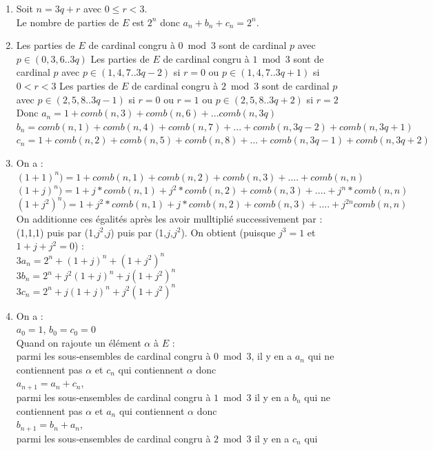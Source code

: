\documentclass[a4paper,11pt]{book}
\begin{document}
\begin{enumerate}
\item Soit $n=3q+r$ avec $0\leq r<3$.\\
Le nombre de parties de $E$ est $2^n$ donc $a_n+b_n+c_n=2^n$.
\item Les parties de $E$ de cardinal congru \`a $0\bmod 3$ sont de cardinal $p$
avec $p\in (0,3,6..3q)$
Les parties de $E$ de cardinal congru \`a $1\bmod 3$ sont de cardinal $p$
avec $p\in (1,4,7..3q-2)$ si $r=0$ ou $p\in (1,4,7..3q+1)$ si $0<r<3$
Les parties de $E$ de cardinal congru \`a $2\bmod 3$ sont de cardinal $p$
avec $p\in (2,5,8..3q-1)$ si $r=0$ ou $r=1$ ou $p\in (2,5,8..3q+2)$ si $r=2$
Donc
$a_n=1+comb(n,3)+comb(n,6)+...comb(n,3q)$
$b_n=comb(n,1)+comb(n,4)+comb(n,7)+...+comb(n,3q-2)+comb(n,3q+1)$
$c_n=1+comb(n,2)+comb(n,5)+comb(n,8)+...+comb(n,3q-1)+comb(n,3q+2)$
\item
On a :\\
$(1+1)^n)=1+comb(n,1)+comb(n,2)+comb(n,3)+....+comb(n,n)$\\
$(1+j)^n)=1+j*comb(n,1)+j^2*comb(n,2)+comb(n,3)+....+j^n*comb(n,n)$\\
$(1+j^2)^n)=1+j^2*comb(n,1)+j*comb(n,2)+comb(n,3)+....+j^{2n}comb(n,n)$\\
On additionne ces \'egalit\'es apr\`es les avoir mulltipli\'e successivement 
par  : \\
(1,1,1) puis par (1,$j^2$,$j$) puis par (1,$j$,$j^2$).
On obtient (puisque $j^3=1$ et $1+j+j^2=0$) :\\
$3a_n=2^n+(1+j)^n+(1+j^2)^n$\\
$3b_n=2^n+j^2(1+j)^n+j(1+j^2)^n$\\
$3c_n=2^n+j(1+j)^n+j^2(1+j^2)^n$\\
\item
On a :\\
$a_0=1$, $b_0=c_0=0$\\
Quand on rajoute un \'el\'ement $\alpha$ \`a $E$ :\\
parmi les sous-ensembles de cardinal  congru \`a $0\bmod 3$, il y en a $a_n$ 
qui ne 
contiennent pas $\alpha$ et $c_n$ qui contiennent $\alpha$ donc \\
$a_{n+1}=a_n+c_n$,\\
parmi les sous-ensembles de cardinal  congru \`a $1\bmod 3$ il y en a $b_n$ qui
ne contiennent pas $\alpha$ et $a_n$ qui contiennent $\alpha$ donc \\
$b_{n+1}=b_n+a_n$,\\
parmi les sous-ensembles de cardinal  congru \`a $2\bmod 3$ il y en a $c_n$ qui

\end{enumerate}
\end{document}
